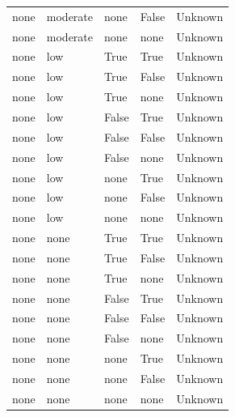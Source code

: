 \begin{longtable}{@{}lllll@{}}
none & moderate & none & False & Unknown \\
none & moderate & none & none & Unknown \\
none & low & True & True & Unknown \\
none & low & True & False & Unknown \\
none & low & True & none & Unknown \\
none & low & False & True & Unknown \\
none & low & False & False & Unknown \\
none & low & False & none & Unknown \\
none & low & none & True & Unknown \\
none & low & none & False & Unknown \\
none & low & none & none & Unknown \\
none & none & True & True & Unknown \\
none & none & True & False & Unknown \\
none & none & True & none & Unknown \\
none & none & False & True & Unknown \\
none & none & False & False & Unknown \\
none & none & False & none & Unknown \\
none & none & none & True & Unknown \\
none & none & none & False & Unknown \\
none & none & none & none & Unknown \\
\end{longtable}

